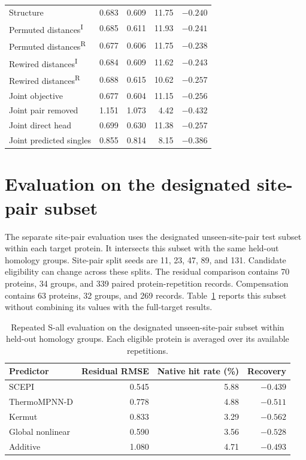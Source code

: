 \documentclass{llncs}
\begin{document}
\begin{table}[!htbp]
\begin{tabular}{lrrrr}
Structure & 0.683 & 0.609 & 11.75 & $-0.240$ \\
Permuted distances\textsuperscript{I} & 0.685 & 0.611 & 11.93 & $-0.241$ \\
Permuted distances\textsuperscript{R} & 0.677 & 0.606 & 11.75 & $-0.238$ \\
Rewired distances\textsuperscript{I} & 0.684 & 0.609 & 11.62 & $-0.243$ \\
Rewired distances\textsuperscript{R} & 0.688 & 0.615 & 10.62 & $-0.257$ \\
Joint objective & 0.677 & 0.604 & 11.15 & $-0.256$ \\
Joint pair removed & 1.151 & 1.073 & 4.42 & $-0.432$ \\
Joint direct head & 0.699 & 0.630 & 11.38 & $-0.257$ \\
Joint predicted singles & 0.855 & 0.814 & 8.15 & $-0.386$ \\
\bottomrule
\end{tabular}
\end{table}

\FloatBarrier
\section{Evaluation on the designated site-pair subset}

The separate site-pair evaluation uses the designated unseen-site-pair test subset within each target protein. It intersects this subset with the same held-out homology groups. Site-pair split seeds are 11, 23, 47, 89, and 131. Candidate eligibility can change across these splits. The residual comparison contains 70 proteins, 34 groups, and 339 paired protein-repetition records. Compensation contains 63 proteins, 32 groups, and 269 records. Table~\ref{tab:pairsubset} reports this subset without combining its values with the full-target results.

\begin{table}[H]
\centering
\caption{Repeated S-all evaluation on the designated unseen-site-pair subset within held-out homology groups. Each eligible protein is averaged over its available repetitions.}
\label{tab:pairsubset}
\begin{tabular}{lrrr}
\toprule
Predictor & Residual RMSE & Native hit rate (\%) & Recovery \\
\midrule
SCEPI & 0.545 & 5.88 & $-0.439$ \\
ThermoMPNN-D & 0.778 & 4.88 & $-0.511$ \\
Kermut & 0.833 & 3.29 & $-0.562$ \\
Global nonlinear & 0.590 & 3.56 & $-0.528$ \\
Additive & 1.080 & 4.71 & $-0.493$ \\
\bottomrule
\end{tabular}
\end{table}
\end{document}
